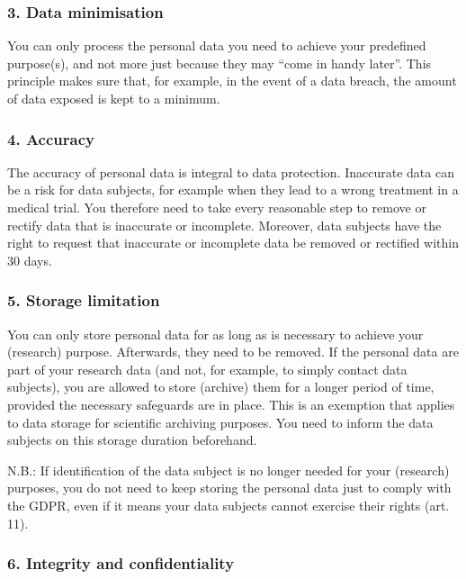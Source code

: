 \documentclass[
]{book}
\begin{document}
\hypertarget{data-minimisation}{%
\subsubsection{3. Data minimisation}\label{data-minimisation}}

You can only process the personal data you need to achieve your predefined purpose(s), and not more just
because they may ``come in handy later''. This principle makes sure that, for example, in the event of a
data breach, the amount of data exposed is kept to a minimum.

\hypertarget{accuracy}{%
\subsubsection{4. Accuracy}\label{accuracy}}

The accuracy of personal data is integral to data protection. Inaccurate data can be a risk for data subjects,
for example when they lead to a wrong treatment in a medical trial. You therefore need to take every reasonable
step to remove or rectify data that is inaccurate or incomplete. Moreover, data subjects have the
right to request that inaccurate or incomplete data be removed
or rectified within 30 days.

\hypertarget{storage-limitation}{%
\subsubsection{5. Storage limitation}\label{storage-limitation}}

You can only store personal data for as long as is necessary to achieve your (research) purpose.
Afterwards, they need to be removed. If the personal data are part of your research data (and not,
for example, to simply contact data subjects), you are allowed to store (archive) them for a longer period
of time, provided the necessary safeguards are in place. This is an exemption that applies to data storage
for scientific archiving purposes. You need to inform the data subjects on this storage duration beforehand.

N.B.: If identification of the data subject is no longer needed for your (research) purposes, you
do not need to keep storing the personal data just to comply with the GDPR, even if it means your
data subjects cannot exercise their rights (art. 11).

\hypertarget{integrity-and-confidentiality}{%
\subsubsection{6. Integrity and confidentiality}\label{integrity-and-confidentiality}}
\end{document}
